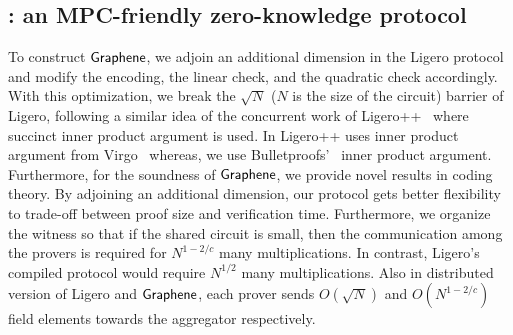 \subsection{\name{}: an MPC-friendly zero-knowledge protocol}
To construct $\textsf{Graphene}$, we adjoin an additional dimension in the Ligero protocol and modify the encoding, the linear check, and the quadratic check accordingly. With this optimization, we break the $\sqrt{N}$ ($N$ is the size of the circuit) barrier of Ligero, following a similar idea of the concurrent work of Ligero++~\cite{ligero++} where succinct inner product argument is used. In Ligero++ uses inner product argument from Virgo~\cite{Virgo} whereas, we use Bulletproofs'~\cite{bulletproofs} inner product argument. Furthermore, for the soundness of $\textsf{Graphene}$, we provide novel results in coding theory. By adjoining an additional dimension, our protocol gets better flexibility to trade-off between proof size and verification time. Furthermore, we organize the witness so that if the shared circuit is small, then the communication among the provers is required for $N^{1-2/c}$ many multiplications. In contrast, Ligero's compiled protocol would require $N^{1/2}$ many multiplications. Also in distributed version of Ligero and $\textsf{Graphene}$, each prover sends $O(\sqrt{N})$ and $O(N^{1-2/c})$ field elements towards the aggregator respectively.
